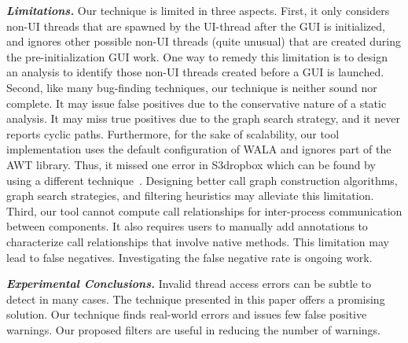 \vspace{1mm}

\noindent \textbf{\textit{Limitations.}}
Our technique is limited in three aspects. First, it only considers
non-UI threads that are spawned by the UI-thread after the GUI
is initialized, and ignores other possible non-UI threads (quite unusual)
that are created during the pre-initialization GUI work. One way
to remedy this limitation is to design an analysis to identify
those non-UI threads created before a GUI is launched.
Second, like many bug-finding techniques, our technique
is neither sound nor complete. It may issue false positives
due to the conservative nature of a static analysis.
It may miss true positives due to the graph search strategy,
and it never reports cyclic paths. Furthermore, for the
sake of scalability, our tool implementation uses the default
configuration of WALA and ignores part of the AWT library. Thus,
it missed one error in S3dropbox which can be found by using a different
technique~\cite{JSR308-webpage-201110}.
Designing better call graph construction algorithms,
graph search strategies, and filtering heuristics may alleviate this limitation.
Third, our tool cannot compute call relationships
for inter-process communication between components. It also
requires users to manually add annotations to characterize
call relationships that involve native methods. This limitation
may lead to false negatives. Investigating the false negative
rate is ongoing work.


\vspace{1mm}

\noindent \textbf{\textit{Experimental Conclusions.}}
Invalid thread access errors  can be subtle to detect in many cases.
The technique presented in this paper offers a promising solution.
Our technique finds real-world errors and issues
few false positive warnings. Our
proposed filters are useful in reducing the number of warnings.



